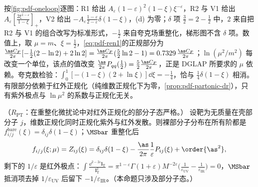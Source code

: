 
\begin{example}\label{ex:pdf-oneloop}
按\cref{fig:pdf-oneloop}逐图：R1 给出 $A_\varepsilon(1-\varepsilon)^2(1-\xi)\xi^{-\varepsilon}$，R2 与 V1 给出 $A_\varepsilon[\frac{2\xi^{1-\varepsilon}}{1-\xi}]_+$，V2 给出 $-A_\varepsilon\frac{1-\varepsilon}{2-\varepsilon}\delta(1-\xi)$，(d) 为零；$\delta$ 项 $\frac32=2-\frac12$ 中，$2$ 来自把 R2 与 V1 的组合改写为标准形式，$-\frac12$ 来自夸克场重整化，梯形图不含 $\delta$ 项。数值上，取 $\mu=m$、$\xi=\frac12$，\cref{eq:pdf-ren1}的正规部分为 $\frac{\as C_F}{2\pi}[-\frac12(2-\ln2)+2\ln2]=\frac{\as C_F}{2\pi}(\frac52\ln2-1)=0.7329\,\frac{\as C_F}{2\pi}$；$\ln(\mu^2/m^2)$ 每改变一个单位，该点的值改变 $\frac{\as}{2\pi}P_{qq}(\frac12)=\frac52\frac{\as C_F}{2\pi}$，正是 DGLAP 所要求的 $\mu$ 依赖。夸克数检验：$\int_0^1[-(1-\xi)(2+\ln\xi)]\dd\xi=-\frac14$，恰与 $\frac14\delta(1-\xi)$ 相消。有限部分依赖于红外正规化（纯维数正规化下为零，\cref{prop:pdf-partonic-dr}），只有紫外极点与 $\ln\mu^2$ 的系数与正规化无关。
\end{example}

\begin{proposition}\label{prop:pdf-partonic-dr}
（$R_{\mathrm{PT}}$：在重整化微扰论中对红外正规化的部分子态严格。）
设靶为无质量在壳部分子 $j$，维数正规化同时正规化紫外与红外发散。则裸部分子分布在所有阶都是 $f^{\mathrm{bare}}_{i/j}(\xi)=\delta_{ij}\delta(1-\xi)$；$\MSbar$ 重整化后
\begin{equation}\label{eq:pdf-partonicDR}
f_{i/j}(\xi;\mu)=Z_{ij}(\xi)=\delta_{ij}\delta(1-\xi)-\frac{\as}{2\pi}\frac1\varepsilon P_{ij}(\xi)+\order{\as^2},
\end{equation}
剩下的 $1/\varepsilon$ 是红外极点：$\int\frac{\dd^{2-2\varepsilon}\bm l_{\mathrm T}}{\bm l_{\mathrm T}^2}=\pi^{1-\varepsilon}\Gamma(1+\varepsilon)M^{-2\varepsilon}\big(\frac1{\varepsilon_{\mathrm{UV}}}-\frac1{\varepsilon_{\mathrm{IR}}}\big)=0$，$\MSbar$ 抵消项去掉 $1/\varepsilon_{\mathrm{UV}}$ 后留下 $-1/\varepsilon_{\mathrm{IR}}$。（本命题只涉及部分子态。）
\end{proposition}

